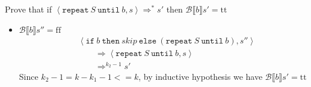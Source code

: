 \begin{exercise}{
    Prove that if $\left<\texttt{repeat}\ S\ \texttt{until}\ b, s\right> \Rightarrow^* s'$ then $\mathcal{B} \llbracket b \rrbracket s' = \text{tt}$
}
\begin{itemize}
\begin{itemize}
                \item $\mathcal{B} \llbracket b \rrbracket s'' = \text{ff}$
                    \begin{align*}
                        &\left<\texttt{if}\ b\ \texttt{then}\ skip\ \texttt{else}\ (\texttt{repeat}\ S\ \texttt{until}\ b), s''\right>
                        \\&\qquad \Rightarrow \left<\texttt{repeat}\ S\ \texttt{until}\ b, s\right>
                        \\&\qquad \Rightarrow^{k_2 - 1} s'
                    \end{align*}
                    Since $k_2 - 1 = k - k_1 - 1 <= k$, by inductive hypothesis we have $\mathcal{B} \llbracket b \rrbracket s' = \text{tt}$
            \end{itemize}
    \end{itemize}
\end{exercise}
